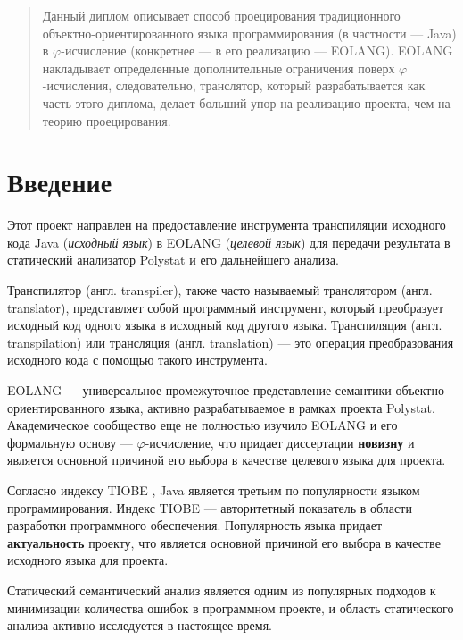 \documentclass[oneside,final,14pt,a4paper]{extreport}
\theoremstyle{definition}
\theoremstyle{remark}
\theoremstyle{remark}
\begin{document}

\tableofcontents
\listoftables
\listoffigures


\newpage

\begin{abstract}
  Данный диплом описывает способ проецирования традиционного объектно-ориентированного языка программирования (в частности --- Java) в $\varphi$-исчисление (конкретнее --- в его реализацию --- EOLANG). EOLANG накладывает определенные дополнительные ограничения поверх $\varphi$-исчисления, следовательно, транслятор, который разрабатывается как часть этого диплома, делает больший упор на реализацию проекта, чем на теорию проецирования.
\end{abstract}

\setcounter{page}{5}


\chapter{Введение}

Этот проект направлен на предоставление инструмента транспиляции исходного кода Java (\emph{исходный язык}) в EOLANG (\emph{целевой язык}) для передачи результата в статический анализатор Polystat \cite{polystat_repo} и его дальнейшего анализа.

Транспилятор (англ. transpiler), также часто называемый транслятором (англ. translator), представляет собой программный инструмент, который преобразует исходный код одного языка в исходный код другого языка. Транспиляция (англ. transpilation) или трансляция (англ. translation) --- это операция преобразования исходного кода с помощью такого инструмента.

EOLANG \cite{eolang_repo} — универсальное промежуточное представление семантики объектно-ориентированного языка, активно разрабатываемое в рамках проекта Polystat. Академическое сообщество еще не полностью изучило EOLANG и его формальную основу --- $\varphi$-исчисление, что придает диссертации \textbf{новизну} и является основной причиной его выбора в качестве целевого языка для проекта.

Согласно индексу TIOBE \cite{tiobe_index}, Java является третьим по популярности языком программирования. Индекс TIOBE — авторитетный показатель в области разработки программного обеспечения. Популярность языка придает \textbf{актуальность} проекту, что является основной причиной его выбора в качестве исходного языка для проекта.

Статический семантический анализ \cite{bardas2010static,epure2016semantic} является одним из популярных подходов к минимизации количества ошибок в программном проекте, и область статического анализа активно исследуется в настоящее время.
\end{document}
